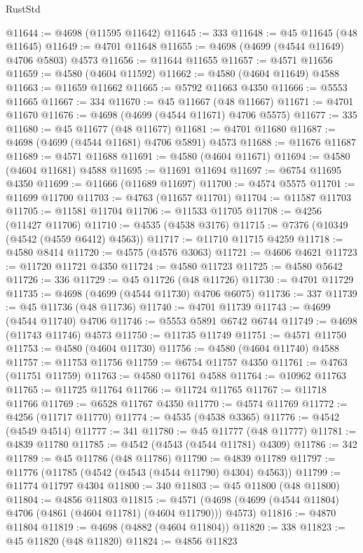 \begin{lexlean}{RustStd}
\begin{coremodule}
@11644 := @4698 (@11595 @11642)
@11645 := 333
@11648 := @45 @11645 (@48 @11645)
@11649 := @4701 @11648
@11655 := @4698 (@4699 (@4544 @11649) @4706 @5803) @4573
@11656 := @11644 @11655
@11657 := @4571 @11656
@11659 := @4580 (@4604 @11592)
@11662 := @4580 (@4604 @11649) @4588
@11663 := @11659 @11662
@11665 := @5792 @11663 @4350
@11666 := @5553 @11665
@11667 := 334
@11670 := @45 @11667 (@48 @11667)
@11671 := @4701 @11670
@11676 := @4698 (@4699 (@4544 @11671) @4706 @5575)
@11677 := 335
@11680 := @45 @11677 (@48 @11677)
@11681 := @4701 @11680
@11687 := @4698 (@4699 (@4544 @11681) @4706 @5891) @4573
@11688 := @11676 @11687
@11689 := @4571 @11688
@11691 := @4580 (@4604 @11671)
@11694 := @4580 (@4604 @11681) @4588
@11695 := @11691 @11694
@11697 := @6754 @11695 @4350
@11699 := @11666 (@11689 @11697)
@11700 := @4574 @5575
@11701 := @11699 @11700
@11703 := @4763 (@11657 @11701)
@11704 := @11587 @11703
@11705 := @11581 @11704
@11706 := @11533 @11705
@11708 := @4256 (@11427 @11706)
@11710 := @4535 (@4538 @3176)
@11715 := @7376 (@10349 (@4542 (@4559 @6412) @4563))
@11717 := @11710 @11715 @4259
@11718 := @4580 @8414
@11720 := @4575 (@4576 @3063)
@11721 := @4606 @4621
@11723 := @11720 @11721 @4350
@11724 := @4580 @11723
@11725 := @4580 @5642
@11726 := 336
@11729 := @45 @11726 (@48 @11726)
@11730 := @4701 @11729
@11735 := @4698 (@4699 (@4544 @11730) @4706 @6075)
@11736 := 337
@11739 := @45 @11736 (@48 @11736)
@11740 := @4701 @11739
@11743 := @4699 (@4544 @11740) @4706
@11746 := @5553 @5891 @6742 @6744
@11749 := @4698 (@11743 @11746) @4573
@11750 := @11735 @11749
@11751 := @4571 @11750
@11753 := @4580 (@4604 @11730)
@11756 := @4580 (@4604 @11740) @4588
@11757 := @11753 @11756
@11759 := @6754 @11757 @4350
@11761 := @4763 (@11751 @11759)
@11763 := @4580 @11761 @4588
@11764 := @10962 @11763
@11765 := @11725 @11764
@11766 := @11724 @11765
@11767 := @11718 @11766
@11769 := @6528 @11767 @4350
@11770 := @4574 @11769
@11772 := @4256 (@11717 @11770)
@11774 := @4535 (@4538 @3365)
@11776 := @4542 (@4549 @4514)
@11777 := 341
@11780 := @45 @11777 (@48 @11777)
@11781 := @4839 @11780
@11785 := @4542 (@4543 (@4544 @11781) @4309)
@11786 := 342
@11789 := @45 @11786 (@48 @11786)
@11790 := @4839 @11789
@11797 := @11776 (@11785 (@4542 (@4543 (@4544 @11790) @4304) @4563))
@11799 := @11774 @11797 @4304
@11800 := 340
@11803 := @45 @11800 (@48 @11800)
@11804 := @4856 @11803
@11815 := @4571 (@4698 (@4699 (@4544 @11804) @4706 (@4861 (@4604 @11781) (@4604 @11790))) @4573)
@11816 := @4870 @11804
@11819 := @4698 (@4882 (@4604 @11804))
@11820 := 338
@11823 := @45 @11820 (@48 @11820)
@11824 := @4856 @11823

\end{coremodule}
\end{lexlean}
